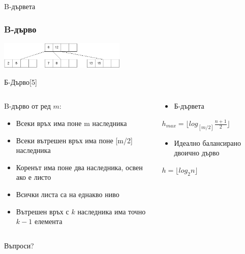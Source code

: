\documentclass{beamer}
\begin{document}
\begin{frame}
  \centerline{B-дървета}
\end{frame}

\begin{frame}[fragile]
  \frametitle{B-дърво}
  \begin{center}
    \includegraphics[width=6cm]{images/btree_example_1}
    
    \bigskip
    Б-Дърво[5]
  \end{center}


  \begin{columns}[t]
    \begin{column}{0.5\textwidth}
      B-дърво от ред $m$:
      \begin{itemize}
        \item Всеки връх има поне m наследника
        \item Всеки вътрешен връх има поне [m/2] наследника
        \item Коренът има поне два наследника, освен ако е листо
        \item Всички листа са на еднакво ниво
        \item Вътрешен връх с $k$ наследника има точно $k-1$ елемента
      \end{itemize}
    \end{column}
    \begin{column}{0.5\textwidth}
      \begin{itemize}
        \item Б-дървета
      \end{itemize}
      $h_{max} = \lfloor log_{[m/2]}\frac{n+1}{2} \rfloor$
      \begin{itemize}
        \item Идеално балансирано двоично дърво
      \end{itemize}
      $h=\lfloor log_2{n} \rfloor$

    \end{column}
  \end{columns}
  

\end{frame}

\begin{frame}
\centerline{Въпроси?}
\end{frame}
\end{document}
